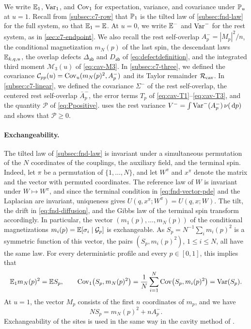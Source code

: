 We write $\mathbb E_1$, $\operatorname{Var}_1$, and $\operatorname{Cov}_1$ for expectation, variance, and
covariance under $\mathbb P_u$ at $u=1$. Recall from \cref{subsec:c7-row}
that $\mathbb P_1$ is the tilted law of \cref{subsec:fnd-law} for the full
system, so that $\mathbb E_1=\mathbb E$. At $u=0$, we write $\mathbb E^-$ and $\operatorname{Var}^-$ for
the rest system, as in \cref{sec:c7-endpoint}. We also recall the rest
self-overlap $A^-_p=|M_p|^2/n$, the conditional magnetization
$m_N(p)$ of the last spin, the descendant laws $\mathbb E_{k,q,u}$, the overlap
defects $\Delta_{\mathsf{ab}}$ and $D_{\mathsf{ab}}$ of
\eqref{eq:defectdefinition}, and the integrated third moment
$\mathcal M_3(u)$ of \eqref{eq:cav-M3}. In \cref{subsec:c7-three}, we
defined the covariance
$\mathcal C_{pp}(u)=\operatorname{Cov}_u(m_N(p)^2,A^-_p)$ and its Taylor remainder
$\mathcal R_{\rm cav}$. In \cref{subsec:c7-linear}, we defined the
covariance $\Sigma^-$ of the rest self-overlap, the centered rest
self-overlap $\bar A^-_p$, the error terms $T_p$ of
\eqref{eq:cav-T1}--\eqref{eq:cav-T3}, and the quantity $\mathcal P$ of
\eqref{eq:Ppositive}.  uses the rest variance
$V^-=\int\operatorname{Var}^-(A^-_p)\,\nu(\,\mathrm d p)$ and shows that $\mathcal P\ge0$.

\paragraph{Exchangeability.} The tilted law of \cref{subsec:fnd-law} is
invariant under a simultaneous permutation of the $N$ coordinates of
the couplings, the auxiliary field, and the terminal spin. Indeed, let
$\pi$ be a permutation of $\{1,\dots,N\}$, and let $W^\pi$ and $x^\pi$
denote the matrix and the vector with permuted coordinates. The
reference law of $W$ is invariant under $W\mapsto W^\pi$, and since the
terminal condition in \eqref{eq:fnd-vector-pde} and the Laplacian are
invariant, uniqueness gives $U(q,x^\pi;W^\pi)=U(q,x;W)$. The tilt, the
drift in \eqref{eq:fnd-diffusion}, and the Gibbs law of the terminal
spin transform accordingly. In particular, the vector $(m_1(p),\dots,m_N(p))$ of the
conditional magnetizations $m_i(p)=\mathbb E[\sigma_i\mid\mathcal G_p]$ is
exchangeable. As $S_p=N^{-1}\sum_im_i(p)^2$ is a symmetric function of
this vector, the pairs $(S_p,m_i(p)^2)$, $1\le i\le N$, all have the
same law. For every deterministic profile and every $p\in[0,1]$, this
implies that
\begin{equation}\label{eq:c7-exchange}
 \mathbb E_1m_N(p)^2=\mathbb E S_p,\qquad
 \operatorname{Cov}_1\bigl(S_p,m_N(p)^2\bigr)
 =\frac1N\sum_{i=1}^N\operatorname{Cov}\bigl(S_p,m_i(p)^2\bigr)
 =\operatorname{Var}(S_p).
\end{equation}
At $u=1$, the vector $M_p$ consists of the first $n$ coordinates of
$m_p$, and we have
\begin{equation}\label{eq:c7-site-split}
 NS_p=m_N(p)^2+nA^-_p .
\end{equation}
Exchangeability of the sites is used in the same way in the cavity
method of \cite[Section~1.6]{TalagrandVolI2011}.


